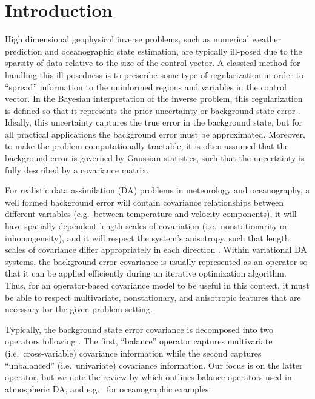 \section{Introduction}
\label{sec:intro}

High dimensional geophysical inverse problems,
such as numerical weather prediction and
oceanographic state estimation, are typically ill-posed due to the
sparsity of data relative to the size of the control vector.
A classical method for handling this ill-posedness is to prescribe
some type of regularization in order to ``spread'' information to the uninformed
regions and variables in the control vector.
In the Bayesian interpretation of the inverse problem, this regularization
is defined so that it represents the prior uncertainty or background-state error
\citep[e.g.][]{bui-thanh_computational_2013}.
Ideally, this uncertainty captures the true error in the background state, but
for all practical applications the background error must be
approximated.
Moreover, to make the problem computationally tractable, it is often assumed
that the background error is governed by Gaussian statistics, such that the
uncertainty is fully described by a covariance matrix.

For realistic data assimilation (DA) problems in meteorology and
oceanography, a well formed background error will contain covariance relationships between
different variables (e.g.\ between temperature and velocity components),
it will have spatially dependent length scales of covariation
(i.e.\ nonstationarity or inhomogeneity),
and it will respect the system's anisotropy, such that length scales of covariance differ
appropriately in each direction \citep[e.g.][]{bannister_review_2008-1}.
Within variational DA systems, the background error covariance is
usually represented as an operator so that it can be applied efficiently during
an iterative optimization algorithm.
Thus, for an operator-based covariance model to be useful in this context, it must be
able to respect multivariate, nonstationary, and anisotropic features that are
necessary for the given problem setting.

Typically, the background state error covariance is decomposed into two
operators following \citet{derber_reformulation_1999}.
The first, ``balance'' operator captures multivariate (i.e.\ cross-variable)
covariance information while the second captures ``unbalanced'' (i.e.\
univariate) covariance information.
Our focus is on the latter operator, but we note the review by
\citet{bannister_review_2008-2} which outlines balance operators used in
atmospheric DA, and e.g.\ \citet{weaver_multivariate_2005,moore_regional_2011-1} for oceanographic
examples.

